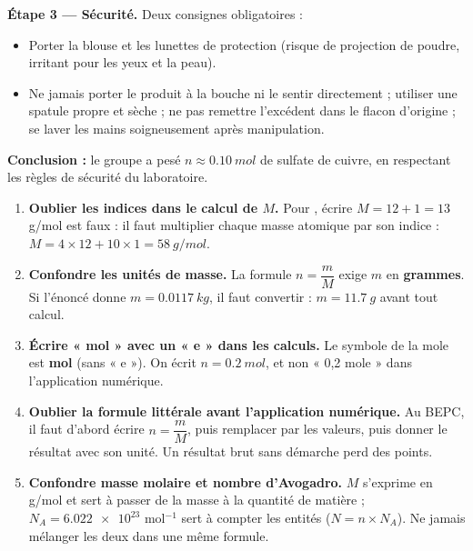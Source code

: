 \documentclass[11pt]{article}
\newcounter{popsec}
\newcounter{popsub}
\newcommand{\courssub}[1]{%
  \stepcounter{popsub}%
  \par\vspace{9pt}\noindent{\popxbold\fontsize{11.5}{13}\selectfont\color{popink}{\color{poporange}\thepopsec.\thepopsub}\hspace{6pt}#1}\par\nopagebreak\vspace{4pt}
}
\begin{document}
\begin{exoresolu}
\textbf{Étape 3 — Sécurité.} Deux consignes obligatoires :
\begin{itemize}
\item Porter la blouse et les lunettes de protection (risque de projection de poudre,  irritant pour les yeux et la peau).
\item Ne jamais porter le produit à la bouche ni le sentir directement ; utiliser une spatule propre et sèche ; ne pas remettre l'excédent dans le flacon d'origine ; se laver les mains soigneusement après manipulation.
\end{itemize}

\textbf{Conclusion :} le groupe a pesé $n \approx \SI{0,10}{mol}$ de sulfate de cuivre, en respectant les règles de sécurité du laboratoire.
\end{exoresolu}

\begin{attention}
\begin{enumerate}
\item \textbf{Oublier les indices dans le calcul de $M$.} Pour , écrire $M = 12 + 1 = 13$ g/mol est faux : il faut multiplier chaque masse atomique par son indice : $M = 4 \times 12 + 10 \times 1 = \SI{58}{g/mol}$.
\item \textbf{Confondre les unités de masse.} La formule $n = \dfrac{m}{M}$ exige $m$ en \textbf{grammes}. Si l'énoncé donne $m = \SI{0,0117}{kg}$, il faut convertir : $m = \SI{11,7}{g}$ avant tout calcul.
\item \textbf{Écrire « mol » avec un « e » dans les calculs.} Le symbole de la mole est \textbf{mol} (sans « e »). On écrit $n = \SI{0,2}{mol}$, et non « 0,2 mole » dans l'application numérique.
\item \textbf{Oublier la formule littérale avant l'application numérique.} Au BEPC, il faut d'abord écrire $n = \dfrac{m}{M}$, puis remplacer par les valeurs, puis donner le résultat avec son unité. Un résultat brut sans démarche perd des points.
\item \textbf{Confondre masse molaire et nombre d'Avogadro.} $M$ s'exprime en g/mol et sert à passer de la masse à la quantité de matière ; $N_A = \num{6,022e23}$ mol$^{-1}$ sert à compter les entités ($N = n \times N_A$). Ne jamais mélanger les deux dans une même formule.
\end{enumerate}
\end{attention}

\courssub{Exercices d'entraînement}
\end{document}

